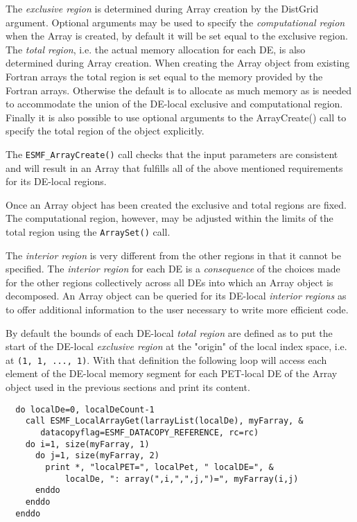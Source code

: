   
   The {\em exclusive region} is determined during Array creation by the 
   DistGrid argument. Optional arguments may be used to specify the 
   {\em computational region} when the Array is created, by default it will be
   set equal to the exclusive region. The {\em total region}, i.e. the actual
   memory allocation for each DE, is also determined during Array creation. When
   creating the Array object from existing Fortran arrays the total region is
   set equal to the memory provided by the Fortran arrays. Otherwise the 
   default is to allocate as much memory as is needed to accommodate the union
   of the DE-local exclusive and computational region. Finally it is also
   possible to use optional arguments to the ArrayCreate() call to specify the
   total region of the object explicitly.
  
   The {\tt ESMF\_ArrayCreate()} call checks that the input parameters are
   consistent and will result in an Array that fulfills all of the above 
   mentioned requirements for its DE-local regions.
  
   Once an Array object has been created the exclusive and total regions are
   fixed. The computational region, however, may be adjusted within the limits
   of the total region using the {\tt ArraySet()} call.
  
   The {\em interior region} is very different from the other regions in that
   it cannot be specified. The {\em interior region} for each DE is a {\em
   consequence} of the choices made for the other regions collectively across
   all DEs into which an Array object is decomposed. An Array object can be
   queried for its DE-local {\em interior regions} as to offer additional
   information to the user necessary to write more efficient code.
  
   By default the bounds of each DE-local {\em total region} are defined as
   to put the start of the DE-local {\em exclusive region} at the "origin" of 
   the local index space, i.e. at {\tt (1, 1, ..., 1)}. With that definition the
   following loop will access each element of the DE-local memory segment for
   each PET-local DE of the Array object used in the previous sections and
   print its content. 

 \begin{verbatim}
  do localDe=0, localDeCount-1
    call ESMF_LocalArrayGet(larrayList(localDe), myFarray, &
       datacopyflag=ESMF_DATACOPY_REFERENCE, rc=rc)
    do i=1, size(myFarray, 1)
      do j=1, size(myFarray, 2)
        print *, "localPET=", localPet, " localDE=", &
            localDe, ": array(",i,",",j,")=", myFarray(i,j)
      enddo
    enddo
  enddo
 
\end{verbatim}
 
